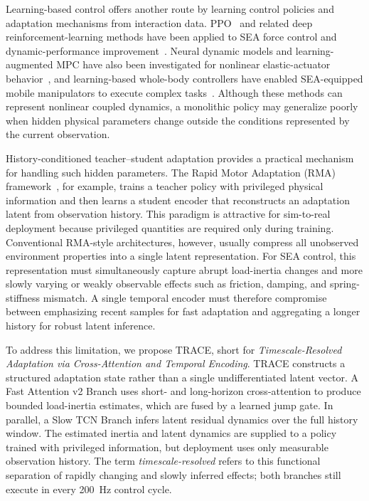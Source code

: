 \documentclass[letterpaper,journal]{IEEEtran}
\begin{document}
Learning-based control offers another route by learning control policies and adaptation mechanisms from interaction data. PPO~\cite{schulman2017Proximal} and related deep reinforcement-learning methods have been applied to SEA force control and dynamic-performance improvement~\cite{sambhus2023real,lahmann2025series,xia2026high}. Neural dynamic models and learning-augmented MPC have also been investigated for nonlinear elastic-actuator behavior~\cite{umurzakov2025neural,zhang2024Development}, and learning-based whole-body controllers have enabled SEA-equipped mobile manipulators to execute complex tasks~\cite{liu2021whole,ren2022integrated}. Although these methods can represent nonlinear coupled dynamics, a monolithic policy may generalize poorly when hidden physical parameters change outside the conditions represented by the current observation.

History-conditioned teacher--student adaptation provides a practical mechanism for handling such hidden parameters. The Rapid Motor Adaptation (RMA) framework~\cite{kumar2021RMA}, for example, trains a teacher policy with privileged physical information and then learns a student encoder that reconstructs an adaptation latent from observation history. This paradigm is attractive for sim-to-real deployment because privileged quantities are required only during training. Conventional RMA-style architectures, however, usually compress all unobserved environment properties into a single latent representation. For SEA control, this representation must simultaneously capture abrupt load-inertia changes and more slowly varying or weakly observable effects such as friction, damping, and spring-stiffness mismatch. A single temporal encoder must therefore compromise between emphasizing recent samples for fast adaptation and aggregating a longer history for robust latent inference.

To address this limitation, we propose TRACE, short for \emph{Timescale-Resolved Adaptation via Cross-Attention and Temporal Encoding}. TRACE constructs a structured adaptation state rather than a single undifferentiated latent vector. A Fast Attention v2 Branch uses short- and long-horizon cross-attention to produce bounded load-inertia estimates, which are fused by a learned jump gate. In parallel, a Slow TCN Branch infers latent residual dynamics over the full history window. The estimated inertia and latent dynamics are supplied to a policy trained with privileged information, but deployment uses only measurable observation history. The term \emph{timescale-resolved} refers to this functional separation of rapidly changing and slowly inferred effects; both branches still execute in every 200~Hz control cycle.
\end{document}
